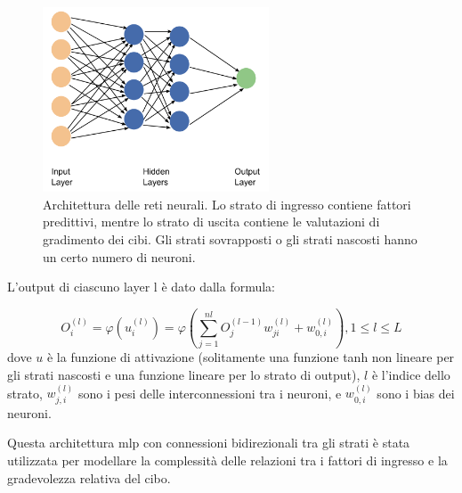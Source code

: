 \begin{figure}[H]
      \centering
      \includegraphics[width=0.6\textwidth]{Chapters/Figures/ArchitectureANN.png}
      \caption{\small Architettura delle reti neurali. Lo strato di ingresso contiene fattori predittivi, mentre lo strato di uscita contiene le valutazioni di gradimento dei cibi. Gli strati sovrapposti o gli strati nascosti hanno un certo numero di neuroni.}
      \label{fig:architectureann}
  \end{figure}

  L'output di ciascuno layer l è dato dalla formula:

\begin{equation}
  O_i^{(l)} = \varphi(u_i^{(l)}) = \varphi(\sum_{j=1}^{nl} O_j^{(l-1)} w_{ji}^{(l)} + w_{0,i}^{(l)}), 1 \le l \le L
\end{equation}
  dove $u$ è la funzione di attivazione (solitamente una funzione \gls{tanh} non lineare per gli strati nascosti e una funzione lineare per lo strato di output), $l$ è l'indice dello strato, $w_{j,i}^{(l)}$ sono i pesi delle interconnessioni tra i neuroni, e $w_{0,i}^{(l)}$ sono i bias dei neuroni.

  Questa architettura \gls{mlp} con connessioni bidirezionali tra gli strati è stata utilizzata per modellare la complessità delle relazioni tra i fattori di ingresso e la gradevolezza relativa del cibo.

